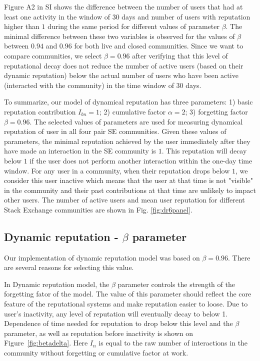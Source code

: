 Figure A2 in SI shows the difference between the number of users that had at least one activity in the window of 30 days and number of users with reputation higher than $1$ during the same period for different values of parameter $\beta$. The minimal difference between these two variables is observed for the values of $\beta$ between $0.94$ and $0.96$ for both live and closed communities. Since we want to compare communities, we select $\beta = 0.96$ after verifying that this level of reputational decay does not reduce the number of active users (based on their dynamic reputation) below the actual number of users who have been active (interacted with the community) in the time window of 30 days. 

To summarize, our model of dynamical reputation has three parameters: 1) basic reputation contribution $I_{bn}=1$; 2) cumulative factor $\alpha=2$; 3) forgetting factor $\beta=0.96$. The selected values of parameters are used for measuring dynamical reputation of user in all four pair SE communities. Given these values of parameters, the minimal reputation achieved by the user immediately after they have made an interaction in the SE community is $1$. This reputation will decay below $1$ if the user does not perform another interaction within the one-day time window. For any user in a community, when their reputation drops below $1$, we consider this user inactive which means that the user at that time is not "visible" in the community and their past contributions at that time are unlikely to impact other users. The number of active users and mean user reputation for different Stack Exchange communities are shown in Fig. \ref{fig:dr6panel}.

\subsection{Dynamic reputation - $\beta$ parameter}

Our implementation of dynamic reputation model was based on $\beta = 0.96$. There are several reasons for selecting this value.

In Dynamic reputation model, the $\beta$ parameter controls the strength of the forgetting fator of the model.  The value of this parameter should reflect the core feature of the reputational systems and make reputation easier to loose. Due to user's inactivity, any level of reputation will eventually decay to below 1. Dependence of time needed for reputation to drop below this level and the $\beta$ parameter, as well as reputation before inactivity is shown on Figure~\ref{fig:betadelta}. Here $I_n$ is equal to the raw number of interactions in the community without forgetting or cumulative factor at work.

